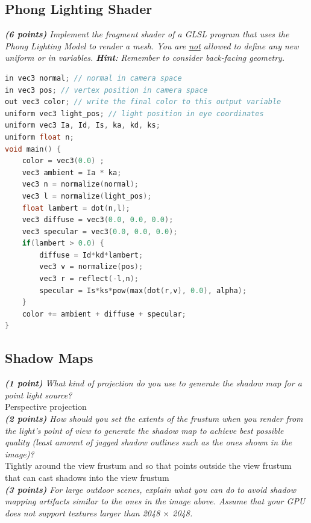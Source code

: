 \documentclass[a4paper,10pt]{article}
\begin{document}
\subsection{Phong Lighting Shader}
\textit{\textbf{(6 points)} Implement the fragment shader of a GLSL program that uses the Phong Lighting Model to render a mesh. You are \underline{not} allowed to define any new uniform or in variables. \textbf{Hint}: Remember to consider back-facing geometry.}\\

\begin{lstlisting}[language=C]
in vec3 normal; // normal in camera space
in vec3 pos; // vertex position in camera space
out vec3 color; // write the final color to this output variable
uniform vec3 light_pos; // light position in eye coordinates
uniform vec3 Ia, Id, Is, ka, kd, ks; 
uniform float n;
void main() {
	color = vec3(0.0) ;
	vec3 ambient = Ia * ka;
	vec3 n = normalize(normal);
	vec3 l = normalize(light_pos);
	float lambert = dot(n,l);
	vec3 diffuse = vec3(0.0, 0.0, 0.0);
	vec3 specular = vec3(0.0, 0.0, 0.0);
	if(lambert > 0.0) {
		diffuse = Id*kd*lambert;
		vec3 v = normalize(pos);
		vec3 r = reflect(-l,n);
		specular = Is*ks*pow(max(dot(r,v), 0.0), alpha);
	}
	color += ambient + diffuse + specular;
}
\end{lstlisting}

\subsection{Shadow Maps}
\textit{\textbf{(1 point)} What kind of projection do you use to generate the shadow map for a point light source? }\\

Perspective projection\\

\textit{\textbf{(2 points)} How should you set the extents of the frustum when you render from the light's point of view to generate the shadow map to achieve best possible quality (least amount of jagged shadow outlines such as the ones shown in the image)?}\\

Tightly around the view frustum and so that points outside the view frustum that can cast shadows into the view frustum\\

\textit{\textbf{(3 points)} For large outdoor scenes, explain what you can do to avoid shadow mapping artifacts similar to the ones in the image above. Assume that your GPU does not support textures larger than 2048 $\times$ 2048.}\\
\end{document}
